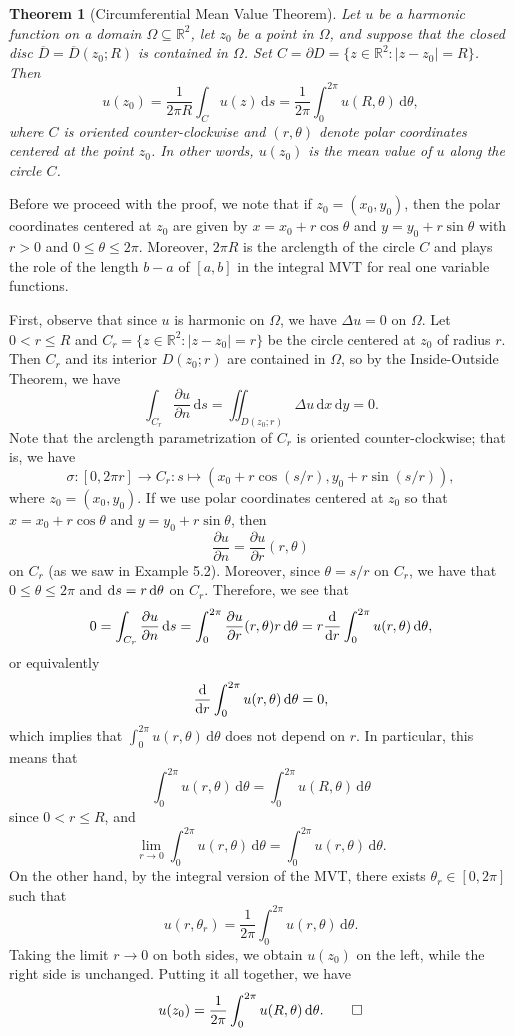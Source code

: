 \documentclass[10pt]{article}
\makeatletter
\newcommand{\R}{\mathbb{R}}
\newcommand{\dd}{\,\mathrm{d}}
\theoremstyle{newstyle}
\newtheorem{thm}{Theorem}[section]
\newenvironment{pf}[1][\proofname]{\par
  \pushQED{\qed}%
  \normalfont \topsep0\p@\relax
  \trivlist
  \item[\hskip\labelsep\scshape
  #1\@addpunct{.}]\ignorespaces
}{%
  \popQED\endtrivlist\@endpefalse
}
\makeatother
\begin{document}
\begin{thm}[Circumferential Mean Value Theorem]
Let $u$ be a harmonic function on a domain $\Omega \subseteq \R^2$, let $z_0$ be a point 
in $\Omega$, and suppose that the closed disc $\overline{D} = \overline{D}(z_0; R)$ is contained 
in $\Omega$. Set $C = \partial D = \{z \in \R^2 : |z - z_0| = R\}$. Then 
\[ u(z_0) = \frac{1}{2\pi R} \int_C u(z)\dd s = \frac{1}{2\pi} \int_0^{2\pi} u(R, \theta) \dd \theta, \]
where $C$ is oriented counter-clockwise and $(r, \theta)$ denote polar coordinates 
centered at the point $z_0$. In other words, $u(z_0)$ is the mean value of $u$ 
along the circle $C$.
\end{thm}
\begin{pf}
Before we proceed with the proof, we note that if $z_0 = (x_0, y_0)$, then the polar coordinates 
centered at $z_0$ are given by $x = x_0 + r\cos\theta$ and $y = y_0 + r\sin\theta$ with 
$r > 0$ and $0 \leq \theta \leq 2\pi$. Moreover, $2\pi R$ is the arclength of the circle $C$ 
and plays the role of the length $b-a$ of $[a, b]$ in the integral MVT for real 
one variable functions.

First, observe that since $u$ is harmonic on $\Omega$, we have $\Delta u = 0$ on $\Omega$. 
Let $0 < r \leq R$ and $C_r = \{z \in \R^2 : |z - z_0| = r\}$ be the circle centered at 
$z_0$ of radius $r$. Then $C_r$ and its interior $D(z_0; r)$ are contained in $\Omega$, 
so by the Inside-Outside Theorem, we have 
\[ \int_{C_r} \frac{\partial u}{\partial n} \dd s = \iint_{D(z_0; r)} \Delta u \dd x \dd y = 0. \]
Note that the arclength parametrization of $C_r$ is oriented counter-clockwise; 
that is, we have 
\[ \sigma : [0, 2\pi r] \to C_r : s \mapsto (x_0 + r\cos(s/r), y_0 + r\sin(s/r)), \]
where $z_0 = (x_0, y_0)$. If we use polar coordinates centered at $z_0$ so that 
$x = x_0 + r\cos\theta$ and $y = y_0 + r\sin\theta$, then 
\[ \frac{\partial u}{\partial n} = \frac{\partial u}{\partial r}(r, \theta) \]
on $C_r$ (as we saw in Example 5.2). Moreover, since $\theta = s/r$ on $C_r$, we have that 
$0 \leq \theta \leq 2\pi$ and ${\rm d}s = r\dd\theta$ on $C_r$. Therefore, we see that 
\[ 0 = \int_{C_r} \frac{\partial u}{\partial n}\dd s = \int_0^{2\pi} \frac{\partial u}{\partial r}
(r, \theta)r\dd \theta = r \frac{\rm d}{{\rm d}r} \int_0^{2\pi} u(r, \theta)\dd\theta, \]
or equivalently
\[ \frac{\rm d}{{\rm d}r} \int_0^{2\pi} u(r, \theta)\dd\theta = 0, \] 
which implies that $\int_0^{2\pi} u(r, \theta)\dd\theta$ does not depend on $r$. In particular, 
this means that 
\[ \int_0^{2\pi} u(r, \theta)\dd\theta = \int_0^{2\pi} u(R, \theta)\dd\theta \]
since $0 < r \leq R$, and 
\[ \lim_{r\to0} \int_0^{2\pi} u(r, \theta)\dd\theta = \int_0^{2\pi} u(r, \theta)\dd\theta. \]
On the other hand, by the integral version of the MVT, there exists $\theta_r \in [0, 2\pi]$ 
such that 
\[ u(r, \theta_r) = \frac{1}{2\pi} \int_0^{2\pi} u(r, \theta)\dd\theta. \]
Taking the limit $r \to 0$ on both sides, we obtain $u(z_0)$ on the left, while the 
right side is unchanged. Putting it all together, we have 
\[ u(z_0) = \frac{1}{2\pi} \int_0^{2\pi} u(R, \theta)\dd\theta. \qedhere \]
\end{pf}
\end{document}
